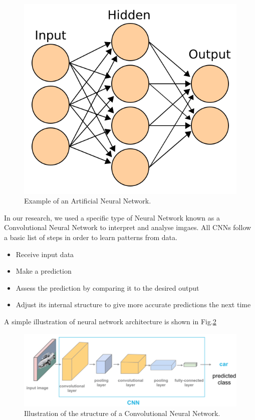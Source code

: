 \documentclass[conference]{IEEEtran}
\begin{document}
\begin{figure}[htb!]  %
  \centering
  \includegraphics[scale=0.3]{images/Artificial_neural_network.png}
  \caption{Example of an Artificial Neural Network.}
  \label{fig:Artificial_Neural_Network}
\end{figure}

In our research, we used a specific type of Neural Network known as a Convolutional Neural Network to interpret and analyse imgaes. All CNNs follow a basic list of steps in order to learn patterns from data.
\begin{itemize}
\item Receive input data
\item Make a prediction
\item Assess the prediction by comparing it to the desired output
\item Adjust its internal structure to give more accurate predictions the next time
\end{itemize}

A simple illustration of neural network architecture is shown in Fig.\ref{fig:CNN_Image} \cite{CNN_Image}
\begin{figure}[h]
 \centering
  \includegraphics[scale=0.3]{images/ConvolutionalNeuralNetwork.png}
  \caption{Illustration of the structure of a Convolutional Neural Network.}
  \label{fig:CNN_Image}
\end{figure}
\end{document}
